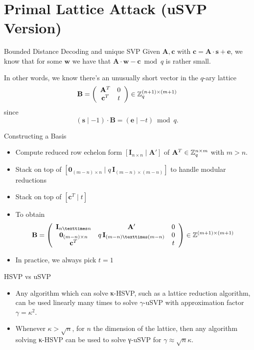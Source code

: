 \documentclass[presentation,smaller]{beamer}
\renewcommand{\vec}[1]{\mathbf{#1}\xspace}
\begin{document}
\section{Primal Lattice Attack (uSVP Version)}
\label{sec:orgb501035}
\begin{frame}[label={sec:orgc7d2ebe}]{Bounded Distance Decoding and unique SVP}
Given \(\vec{A}, \vec{c}\) with \(\vec{c} = \vec{A} ⋅ \vec{s} + \vec{e}\), we know that for some \(\vec{w}\) we have that \(\vec{A}⋅\vec{w} - \vec{c} \bmod q\) is rather small.

In other words, we know there’s an unusually short vector in the \(q\)-ary lattice \[\vec{B}=\left(\begin{array}{cc}
          \vec{A}^T &  0 \\
          \vec{c}^T   & t \\
        \end{array} \right) \in \ZZ_q^{(n+1) \times (m+1)}\] since \[(\vec{s} \mid -1) ⋅ \vec{B} = (\vec{e} \mid -t) \bmod q.\]
\end{frame}

\begin{frame}[label={sec:org83e1128}]{Constructing a Basis}
\begin{itemize}
\item Compute reduced row echelon form \([\vec{I}_{n × n} \mid \vec{A}']\) of \(\vec{A}^T \in \ZZ_q^{n \times m}\) with \(m>n\).
\item Stack on top of \([\vec{0}_{(m-n) \times n} \mid q\,\vec{I}_{(m-n) × (m-n)}]\) to handle modular reductions
\item Stack on top of \([\vec{c}^T \mid t]\)
\item To obtain \[\vec{B}=\left(\begin{array}{ccc}
         \vec{I}_{n × n} & \vec{A}' &  0 \\
         \vec{0}_{(m-n) \times n} & q\,\vec{I}_{(m-n) × (m-n)} & 0\\
          \vec{c}^T  & & t \\
        \end{array} \right) \in \ZZ^{(m+1) \times (m+1)}\]
\item In practice, we always pick \(t=1\)
\end{itemize}
\end{frame}

\begin{frame}[label={sec:org3b73b9e}]{HSVP vs uSVP}
\begin{itemize}
\item Any algorithm which can solve κ-HSVP, such as a lattice reduction algorithm, can be used linearly many times to solve \(γ\)-uSVP with approximation factor \(γ=κ^2\).
\item Whenever \(κ > \sqrt{n}\), for \(n\) the dimension of the lattice, then any algorithm solving κ-HSVP can be used to solve γ-uSVP for \(γ ≈ \sqrt{n} κ\).
\end{itemize}
\end{frame}
\end{document}
